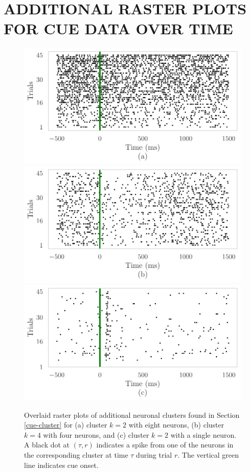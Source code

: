 \documentclass[twoside]{article}
\begin{document}
\section{ADDITIONAL RASTER PLOTS FOR CUE DATA OVER TIME} \label{raster-plots}
\begin{figure}[h]
\begin{center}
\includegraphics[scale=0.5]{../img/cue-raster-appa.pdf}
\includegraphics[scale=0.5]{../img/cue-raster-appb.pdf}
\includegraphics[scale=0.5]{../img/cue-raster-appc.pdf}
\end{center}
\vspace{-4mm}
\caption{Overlaid raster plots of additional neuronal clusters found in Section \ref{cue-cluster} for (a) cluster $k =2$ with eight neurons, (b) cluster $k = 4$ with four neurons, and (c) cluster $k = 2$ with a single neuron.  A black dot at $(\tau, r)$ indicates a spike from one of the neurons in the corresponding cluster at time $\tau$ during trial $r$. The vertical green line indicates cue onset.} \label{cue-rasters}
\end{figure}
\end{document}
